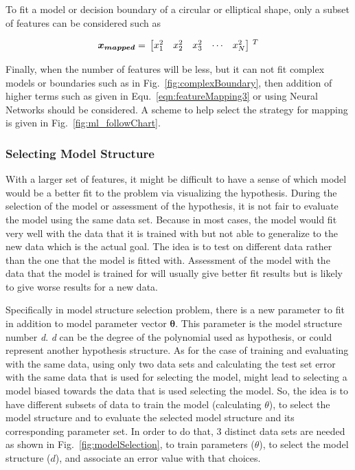 To fit a model or decision boundary of a circular or elliptical shape, only a subset of features can be considered such as

\begin{equation}{\label{eqn:featureMappin54}}
\bm{x_{mapped}}
=\,
\begin{bmatrix}
x_1^2 & x_2^2 & x_3^2 & \cdots & x_N^2  
\end{bmatrix}
\,^ T
\end{equation} 

Finally, when the number of features will be less, but it can not fit complex models or boundaries such as in Fig.~\ref{fig:complexBoundary}, then addition of higher terms such as given in 
Equ.~\ref{eqn:featureMapping3} or using Neural Networks should be considered.
A scheme to help select the strategy for mapping is given in  Fig.~\ref{fig:ml_followChart}. 

\subsubsection{Selecting Model Structure}

With a larger set of features, it might be difficult to have a sense of which model would be a better fit to the problem via visualizing the hypothesis. 
During the selection of the model or assessment of the hypothesis, it is not fair to evaluate the model using the same data set.   
Because in most cases, the model would fit very well with the data that it is trained with but not able to generalize to the new data which is the actual goal. 
The idea is to test on different data rather than the one that the model is fitted with. 
Assessment of the model with the data that the model is trained for will usually give better fit results but is likely to give worse results for a new data. 

Specifically in model structure selection problem, there is a new parameter to fit in addition to model parameter vector $\bm{\theta}$.
This parameter is the model structure number \emph{d}. \emph{d} can be the degree of the polynomial used as hypothesis, or could represent another hypothesis structure.
As for the case of training and evaluating with the same data, using only two data sets and calculating the test set error with the same data that is used for selecting the model, might lead to selecting a model biased towards the data that is used selecting the model.
So, the idea is to have different subsets of data to train the model (calculating $\theta$), to select the model structure and to evaluate the selected model structure and its corresponding parameter set. 
In order to do that, 3 distinct data sets are needed as shown in Fig.~\ref{fig:modelSelection}, to train parameters ($\theta$), to select the model structure ($d$), and associate an error value with that choices. 

